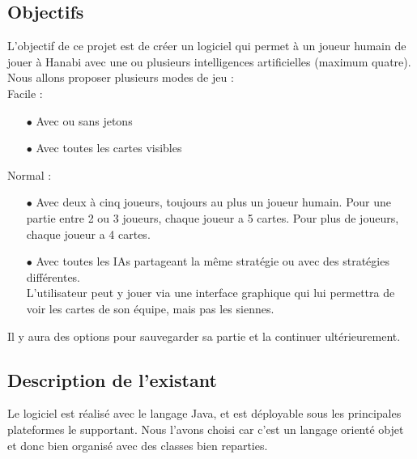 \documentclass[11pt, letterpaper]{article}
\begin{document}
\subsection{Objectifs}

\noindent
L'objectif de ce projet est de créer un logiciel qui permet à un joueur humain de jouer à Hanabi avec une ou plusieurs intelligences artificielles (maximum quatre). Nous allons proposer plusieurs modes de jeu :\\

\noindent
 Facile :

\begin{itemize}

 \item[$\bullet$] Avec ou sans jetons
 \item[$\bullet$] Avec toutes les cartes visibles\\
 
\end{itemize}

\noindent
 Normal :

\begin{itemize}

 \item[$\bullet$] Avec deux à cinq joueurs, toujours au plus un joueur humain. Pour une partie entre 2 ou 3 joueurs, chaque joueur a 5 cartes. Pour plus de joueurs, chaque joueur a 4 cartes.
 \item[$\bullet$] Avec toutes les IAs partageant la même stratégie ou avec des stratégies différentes.\\
 L'utilisateur peut y jouer via une interface graphique qui lui permettra de voir les cartes de son équipe, mais pas les siennes. \\
 
\end{itemize}

\noindent
Il y aura des options pour sauvegarder sa partie et la continuer ultérieurement. 

\subsection{Description de l'existant}

\noindent
Le logiciel est réalisé avec le langage Java, et est déployable sous les principales plateformes le supportant. Nous l'avons choisi car c'est un langage orienté objet et donc bien organisé avec des classes bien reparties. \\
\end{document}
